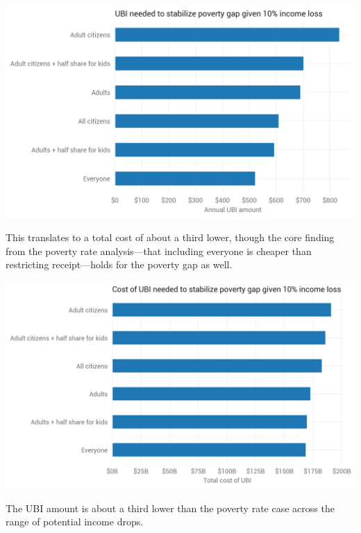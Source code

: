 \documentclass[12pt]{article}
\begin{document}
\begin{center}
\includegraphics[width=15cm]{ubi_pov_gap_10pct.png}
\label{fig:ubi_pov_gap_10pct}
\end{center}

This translates to a total cost of about a third lower, though the core finding from the poverty rate analysis---that including everyone is cheaper than restricting receipt---holds for the poverty gap as well.

\begin{center}
\includegraphics[width=15cm]{ubi_cost_pov_gap_10pct.png}
\label{fig:ubi_cost_pov_gap_10pct}
\end{center}

The UBI amount is about a third lower than the poverty rate case across the range of potential income drops.
\end{document}
